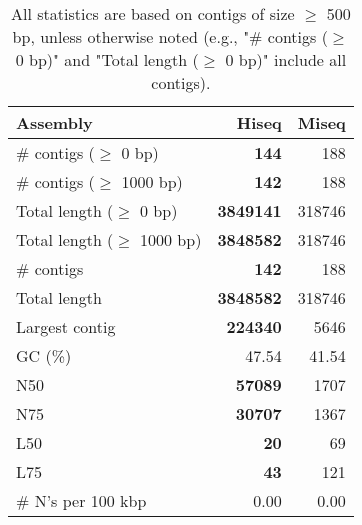 \documentclass[12pt,a4paper]{article}
\begin{document}
\begin{table}[ht]
\begin{center}
\caption{All statistics are based on contigs of size $\geq$ 500 bp, unless otherwise noted (e.g., "\# contigs ($\geq$ 0 bp)" and "Total length ($\geq$ 0 bp)" include all contigs).}
\begin{tabular}{|l*{2}{|r}|}
\hline
Assembly & Hiseq & Miseq \\ \hline
\# contigs ($\geq$ 0 bp) & {\bf 144} & 188 \\ \hline
\# contigs ($\geq$ 1000 bp) & {\bf 142} & 188 \\ \hline
Total length ($\geq$ 0 bp) & {\bf 3849141} & 318746 \\ \hline
Total length ($\geq$ 1000 bp) & {\bf 3848582} & 318746 \\ \hline
\# contigs & {\bf 142} & 188 \\ \hline
Total length & {\bf 3848582} & 318746 \\ \hline
Largest contig & {\bf 224340} & 5646 \\ \hline
GC (\%) & 47.54 & 41.54 \\ \hline
N50 & {\bf 57089} & 1707 \\ \hline
N75 & {\bf 30707} & 1367 \\ \hline
L50 & {\bf 20} & 69 \\ \hline
L75 & {\bf 43} & 121 \\ \hline
\# N's per 100 kbp & 0.00 & 0.00 \\ \hline
\end{tabular}
\end{center}
\end{table}
\end{document}

